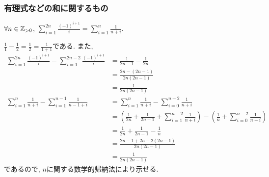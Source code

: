 \subsubsection{有理式などの和に関するもの}
\begin{prop}
  \label{p:20230726}
  $\forall n \in \mathbb{Z}_{>0}$,
  $\sum_{i=1}^{2n}\frac{(-1)^{i+1}}{i}=\sum_{i=1}^n\frac{1}{n+i}$.
\end{prop}
\begin{proof**}
  $\frac{1}{1}-\frac{1}{2}=\frac{1}{2}=\frac{1}{1+1}$である.
  また,
  \begin{align*}
    \sum_{i=1}^{2n}\frac{(-1)^{i+1}}{i}-\sum_{i=1}^{2n-2}\frac{(-1)^{i+1}}{i}
    &=\frac{1}{2n-1}-\frac{1}{2n}\\
    &=\frac{2n-(2n-1)}{2n(2n-1)}\\
    &=\frac{1}{2n(2n-1)}\\
    \sum_{i=1}^n\frac{1}{n+i}-\sum_{i=1}^{n-1}\frac{1}{n-1+i}
    &=\sum_{i=1}^n\frac{1}{n+i}-\sum_{i=0}^{n-2}\frac{1}{n+i}\\
    &=(\frac{1}{2n}+\frac{1}{2n-1}+\sum_{i=1}^{n-2}\frac{1}{n+i})
    -(\frac{1}{n}+\sum_{i=0}^{n-2}\frac{1}{n+i})\\
    &=\frac{1}{2n}+\frac{1}{2n-1}-\frac{1}{n}\\
    &=\frac{2n-1+2n-2(2n-1)}{2n(2n-1)}\\
    &=\frac{1}{2n(2n-1)}
  \end{align*}
  であるので,
  $n$に関する数学的帰納法により示せる.
\end{proof**}
